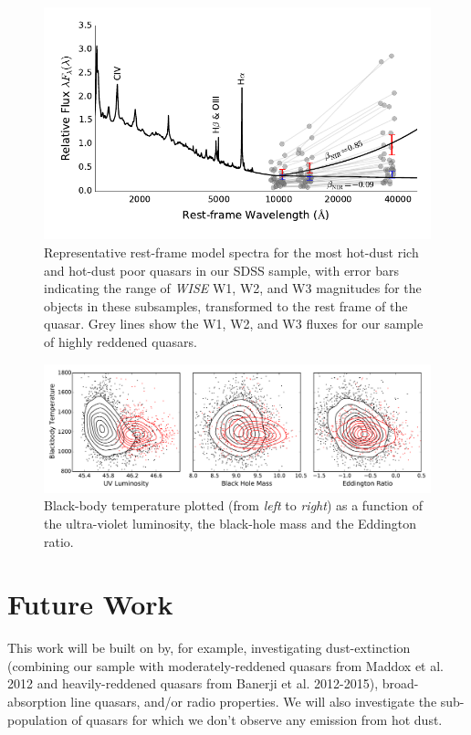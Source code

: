 \begin{figure}
\centering
  \includegraphics[width=\columnwidth]{figures/chapter06/ntt_proposal_figure2.pdf}
\caption{Representative rest-frame model spectra for the
most hot-dust rich and hot-dust poor quasars in our SDSS sample, with
error bars indicating the range of {\it WISE} W1, W2, and W3
magnitudes for the objects in these subsamples, transformed to the
rest frame of the quasar. Grey lines show the W1, W2, and W3 fluxes
for our sample of highly reddened quasars.}
  \label{fig:}
\end{figure}

\begin{figure}
    \centering
    \includegraphics[width=\columnwidth]{figures/chapter05/bbt_correlations.pdf}
    \caption{Black-body temperature plotted (from {\it left} to {\it right}) as a function of the ultra-violet luminosity, the black-hole mass and the Eddington ratio.}  
    \label{fig:figure1}
\end{figure}


\section{Future Work}

This work will be built on by, for example, investigating dust-extinction (combining our sample with moderately-reddened quasars from Maddox et al. 2012 and heavily-reddened quasars from Banerji et al. 2012-2015), broad-absorption line quasars, and/or radio properties. We will also investigate the sub-population of quasars for which we don't observe any emission from hot dust. 

